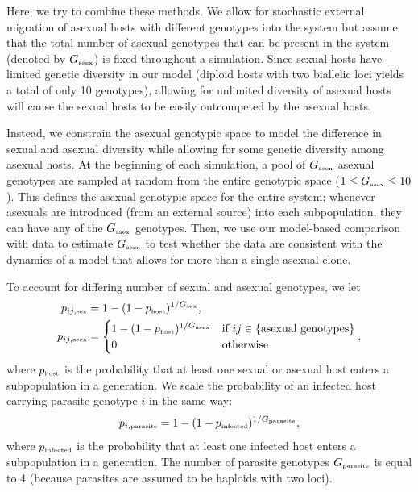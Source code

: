 \documentclass{article}\usepackage[]{graphicx}\usepackage[]{color}
\begin{document}
Here, we try to combine these methods.
We allow for stochastic external migration of asexual hosts with different
genotypes into the system but assume that the total number of asexual genotypes 
that can be present in the system (denoted by $G_{\textrm{\tiny asex}}$) is fixed
throughout a simulation. 
Since sexual hosts have limited genetic diversity in our model (diploid hosts 
with two biallelic loci yields a total of only 10 genotypes), allowing for 
unlimited diversity of asexual hosts will cause the sexual hosts to be 
easily outcompeted by the asexual hosts.

Instead, we constrain the asexual genotypic space to model the difference in sexual 
and asexual diversity while allowing for some genetic diversity among asexual hosts.
At the beginning of each simulation, a pool of $G_{\textrm{\tiny asex}}$ asexual 
genotypes are sampled at random from the entire genotypic space ($1 \leq G_{\textrm{\tiny asex}} \leq 10$).
This defines the asexual genotypic space for the entire system;
whenever asexuals are introduced (from an external source) into each subpopulation, 
they can have any of the $G_{\textrm{\tiny asex}}$ genotypes.
Then, we use our model-based comparison with data to estimate $G_{\textrm{\tiny asex}}$
to test whether the data are consistent with the dynamics of a model that allows 
for more than a single asexual clone.

To account for differing number of sexual and asexual genotypes, we let 
\begin{equation}
\begin{aligned}
p_{ij, \textrm{\tiny sex}} &= 1-(1-p_{\textrm{\tiny host}})^{1/G_\textrm{\tiny sex}},\\
p_{ij, \textrm{\tiny asex}} &=
\begin{cases}
1-(1-p_{\textrm{\tiny host}})^{1/G_\textrm{\tiny asex}} & \text{if } ij \in \{\text{asexual genotypes}\} \\
0 & \text{otherwise}
\end{cases},
\end{aligned}
\end{equation}
where $p_{\textrm{\tiny host}}$ is the probability that at least one sexual or asexual host enters a subpopulation in a generation. We scale the probability of an infected host carrying parasite genotype $i$ in the same way:
\begin{equation}
p_{i, \textrm{\tiny parasite}} = 1 - (1-p_{\textrm{\tiny infected}})^{1/G_\textrm{\tiny parasite}},
\end{equation}
where $p_{\textrm{\tiny infected}}$ is the probability that at least one infected host enters a subpopulation in a generation.
The number of parasite genotypes $G_\textrm{\tiny parasite}$ is equal to 4 (because parasites are assumed to be haploids with two loci).
\end{document}
